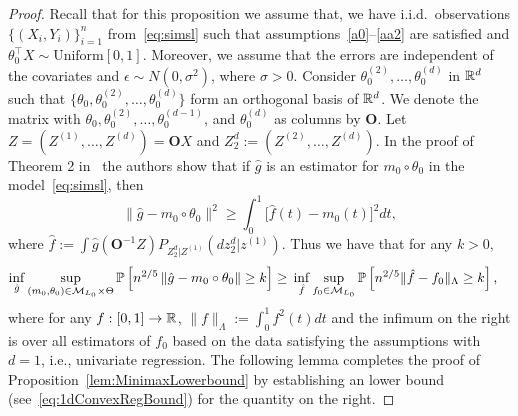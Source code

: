\begin{proof}



Recall that for this proposition we assume that, we have i.i.d.~observations $\{(X_i,Y_i)\}_{i=1}^n$ from~\eqref{eq:simsl} such that assumptions~\ref{a0}--\ref{aa2} are satisfied and $\theta_0^\top X\sim\text{Uniform}[0,1]$. Moreover, we assume that the errors are independent of the covariates and  $\epsilon \sim N(0, \sigma^2)$, where $\sigma>0$.
Consider $\theta_0^{(2)},\ldots, \theta_0^{(d)}$ in $\mathbb{R}^d$ such that $\{\theta_0,\theta_0^{(2)},\ldots, \theta_0^{(d)}\}$ form an orthogonal basis of $\mathbb{R}^d$. We denote the matrix with $\theta_0, \theta_0^{(2)},\ldots,\theta_0^{(d-1)}$, and $\theta_0^{(d)}$ as columns by $\mathbf{O}$.  Let $Z= (Z^{(1)}, \ldots, Z^{(d)})= \mathbf{O} X$ and $Z_2^d :=(Z^{(2)}, \ldots, Z^{(d)})$. In the proof of Theorem 2 in~\cite[Page 561]{MR2369025} the authors show that if $\hat{g}$ is an estimator for $m_0\circ\theta_0$ in the model~\eqref{eq:simsl}, then 
\begin{equation}\label{eq:Equiv_1d_reg}
\|\hat{g}-m_0\circ\theta_0\|^2  \ge \int_{0}^1 \big[\hat{f}(t)-m_0(t)\big]^2 dt,
\end{equation}
where $\hat{f}:= \int \hat{g} (\mathbf{O}^{-1} Z) P_{Z_2^{d}| Z^{(1)}} (dz_2^d|z^{(1)})$. Thus we have that for any $k>0,$
\begin{align}\label{eq:minimaxbound_1}
\begin{split}
  \inf_{\hat{g}}&\sup_{(m_0,\theta_0) \in \M_{L_0}\times \Theta}\mathbb{P}\left[n^{2/5}\norm{\hat{g} - m_0\circ\theta_0} \ge k \right] 
% 
\ge{} \inf_{\hat{f}}\sup_{f_0\in \M_{L_0}}\mathbb{P}\left[n^{2/5}\|\hat{f} - f_0\|_{\Lambda}  \ge k \right],
\end{split}
\end{align}
where for any $f:[0,1] \to \mathbb{R}$, $\|f\|_{\Lambda} := \int_{0}^{1} f^2(t) dt$ and the infimum on the right is over all estimators of $f_0$ based on the data satisfying the assumptions with $d=1$, i.e., univariate regression. The following lemma completes the proof of Proposition~\ref{lem:MinimaxLowerbound} by  establishing an lower bound (see~\eqref{eq:1dConvexRegBound}) for the quantity on the right.
\end{proof}

